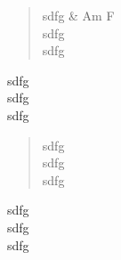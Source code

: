 
\songmaketitle

\begin{verse}
sdfg & Am F\\
sdfg\\
sdfg\\
\end{verse}

\begin{chorus}
sdfg\\
sdfg\\
sdfg\\
\end{chorus}

\begin{verse}
sdfg\\
sdfg\\
sdfg\\
\end{verse}

\begin{chorus}
sdfg\\
sdfg\\
sdfg\\
\end{chorus}
